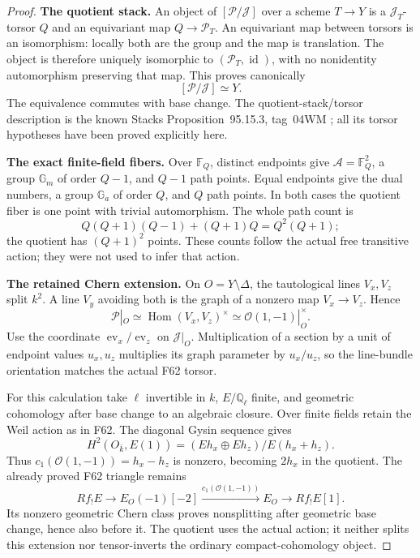 \documentclass[11pt,a4paper]{article}
\newcommand{\fid}[1]{\textsf{#1}}\newcommand{\gate}[1]{\textsf{#1}}
\theoremstyle{named}\newtheorem{finding}{Finding}[section]
\theoremstyle{definition}\newtheorem{definition}[finding]{Definition}
\theoremstyle{remark}\newtheorem{remark}[finding]{Remark}
\begin{document}
\begin{proof}
\par\smallskip\noindent\textbf{The quotient stack.}\quad
An object of \([\mathcal P/\mathcal J]\) over a
scheme \(T\to Y\) is a \(\mathcal J_T\)-torsor \(Q\)
and an equivariant map \(Q\to\mathcal P_T\).
An equivariant map between torsors is an isomorphism:
locally both are the group and the map is translation.
The object is therefore uniquely isomorphic to
\((\mathcal P_T,\operatorname{id})\), with no
nonidentity automorphism preserving that map.
This proves canonically
\begin{equation}\label{eq:variableQuotientIsBase}
                          [\mathcal P/\mathcal J]\simeq Y.
\end{equation}
The equivalence commutes with base change.
The quotient-stack/torsor description is the known
Stacks Proposition~95.15.3, tag~04WM
\cite{StacksVariableQuotients}; all its torsor
hypotheses have been proved explicitly here.

\par\smallskip\noindent\textbf{The exact finite-field fibers.}\quad
Over \(\mathbb F_Q\), distinct endpoints give
\(\mathcal A=\mathbb F_Q^2\), a group
\(\mathbb G_m\) of order \(Q-1\), and \(Q-1\)
path points. Equal endpoints give the dual numbers,
a group \(\mathbb G_a\) of order \(Q\), and \(Q\)
path points. In both cases the quotient fiber is
one point with trivial automorphism.
The whole path count is
\[
 Q(Q+1)(Q-1)+(Q+1)Q=Q^2(Q+1);
\]
the quotient has \((Q+1)^2\) points.
These counts follow the actual free transitive action;
they were not used to infer that action.

\par\smallskip\noindent\textbf{The retained Chern extension.}\quad
On \(O=Y\setminus\Delta\), the tautological lines
\(V_x,V_z\) split \(k^2\).
A line \(V_y\) avoiding both is the graph of a
nonzero map \(V_x\to V_z\). Hence
\begin{equation}\label{eq:variableQuotientChernTorsor}
 \mathcal P|_O
       \simeq\operatorname{Hom}(V_x,V_z)^\times
       \simeq\mathcal O(1,-1)|_O^\times.
\end{equation}
Use the coordinate \(\operatorname{ev}_x/\operatorname{ev}_z\)
on \(\mathcal J|_O\).
Multiplication of a section by a unit of endpoint
values \(u_x,u_z\) multiplies its graph parameter by
\(u_x/u_z\), so the line-bundle orientation matches
the actual \fid{F62} torsor.

For this calculation take \(\ell\) invertible in \(k\),
\(E/\mathbb Q_\ell\) finite, and geometric cohomology
after base change to an algebraic closure.
Over finite fields retain the Weil action as in \fid{F62}.
The diagonal Gysin sequence gives
\[
 H^2(O_{\bar k},E(1))
   =(Eh_x\oplus Eh_z)/E(h_x+h_z).
\]
Thus \(c_1(\mathcal O(1,-1))=h_x-h_z\) is
nonzero, becoming \(2h_x\) in the quotient.
The already proved \fid{F62} triangle remains
\[
 Rf_!E\longrightarrow E_O(-1)[-2]
  \xrightarrow{c_1(\mathcal O(1,-1))}E_O
  \longrightarrow Rf_!E[1].
\]
Its nonzero geometric Chern class proves nonsplitting
after geometric base change, hence also before it.
The quotient uses the actual action; it neither
splits this extension nor tensor-inverts the
ordinary compact-cohomology object.


\end{proof}
\end{document}
